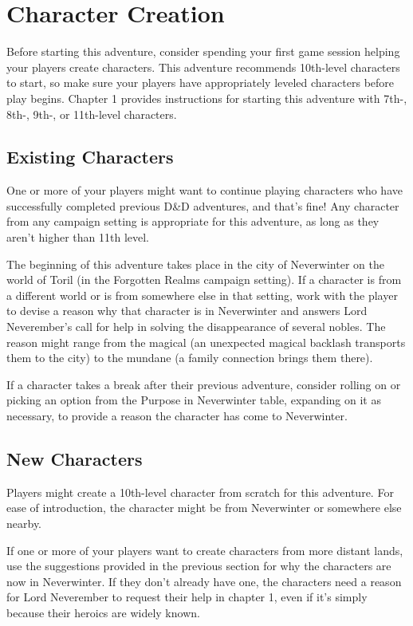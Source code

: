 \documentclass[10pt,a4paper,twoside,bg=print,twocolumn,openany,nodeprecatedcode]{dndbook}
\begin{document}
\section{Character Creation}
Before starting this adventure, consider spending your first game session helping your players create characters. This adventure recommends 10th-level characters to start, so make sure your players have appropriately leveled characters before play begins. Chapter 1 provides instructions for starting this adventure with 7th-, 8th-, 9th-, or 11th-level characters.

\subsection{Existing Characters}
One or more of your players might want to continue playing characters who have successfully completed previous D\&D adventures, and that's fine! Any character from any campaign setting is appropriate for this adventure, as long as they aren't higher than 11th level.

The beginning of this adventure takes place in the city of Neverwinter on the world of Toril (in the Forgotten Realms campaign setting). If a character is from a different world or is from somewhere else in that setting, work with the player to devise a reason why that character is in Neverwinter and answers Lord Neverember's call for help in solving the disappearance of several nobles. The reason might range from the magical (an unexpected magical backlash transports them to the city) to the mundane (a family connection brings them there).

If a character takes a break after their previous adventure, consider rolling on or picking an option from the Purpose in Neverwinter table, expanding on it as necessary, to provide a reason the character has come to Neverwinter.

\subsection{New Characters}
Players might create a 10th-level character from scratch for this adventure. For ease of introduction, the character might be from Neverwinter or somewhere else nearby.

If one or more of your players want to create characters from more distant lands, use the suggestions provided in the previous section for why the characters are now in Neverwinter. If they don't already have one, the characters need a reason for Lord Neverember to request their help in chapter 1, even if it's simply because their heroics are widely known.
\end{document}
